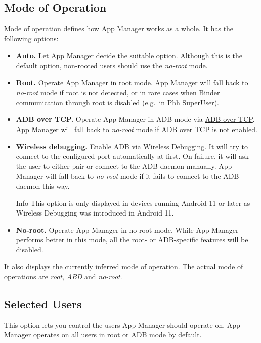 \subsection{Mode of Operation}\label{subsec:mode-of-operation} %
Mode of operation defines how App Manager works as a whole. It has the following options:
\begin{itemize}
    \item \textbf{Auto.} Let App Manager decide the suitable option.
    Although this is the default option, non-rooted users should use the \textit{no-root} mode.

    \item \textbf{Root.} Operate App Manager in root mode. App Manager will fall back to \textit{no-root} mode if root
    is not detected, or in rare cases when Binder communication through root is disabled (e.g.\ in \href{https://github.com/MuntashirAkon/AppManager/issues/606}{Phh SuperUser}).

    \item \textbf{ADB over TCP.} Operate App Manager in ADB mode via \hyperref[sec:adb-over-tcp]{ADB over TCP}.
    App Manager will fall back to \textit{no-root} mode if ADB over TCP is not enabled.

    \item \textbf{Wireless debugging.} Enable ADB via Wireless Debugging. It will try to connect to the configured port
    automatically at first. On failure, it will ask the user to either pair or connect to the ADB daemon manually.
    App Manager will fall back to \textit{no-root} mode if it fails to connect to the ADB daemon this way.
    \begin{tip}{Info}
        This option is only displayed in devices running Android 11 or later as Wireless Debugging was introduced in Android 11.
    \end{tip}

    \item \textbf{No-root.} Operate App Manager in no-root mode. While App Manager performs better in this mode,
    all the root- or ADB-specific features will be disabled.
\end{itemize}

It also displays the currently inferred mode of operation. The actual mode of operations are \textit{root}, \textit{ABD} and \textit{no-root}.

\subsection{Selected Users}\label{subsec:selected-users} %
This option lets you control the users App Manager should operate on. App Manager operates on all users in root or ADB mode by default.

